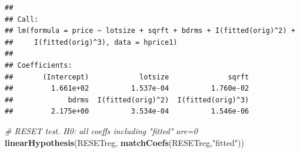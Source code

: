 \documentclass[]{book}
\newenvironment{Shaded}{\begin{snugshade}}{\end{snugshade}}
\newcommand{\CommentTok}[1]{\textcolor[rgb]{0.56,0.35,0.01}{\textit{#1}}}
\newcommand{\KeywordTok}[1]{\textcolor[rgb]{0.13,0.29,0.53}{\textbf{#1}}}
\newcommand{\NormalTok}[1]{#1}
\newcommand{\StringTok}[1]{\textcolor[rgb]{0.31,0.60,0.02}{#1}}
\begin{document}
\begin{verbatim}
## 
## Call:
## lm(formula = price ~ lotsize + sqrft + bdrms + I(fitted(orig)^2) + 
##     I(fitted(orig)^3), data = hprice1)
## 
## Coefficients:
##       (Intercept)            lotsize              sqrft  
##         1.661e+02          1.537e-04          1.760e-02  
##             bdrms  I(fitted(orig)^2)  I(fitted(orig)^3)  
##         2.175e+00          3.534e-04          1.546e-06
\end{verbatim}

\begin{Shaded}
\begin{Highlighting}[]
\CommentTok{# RESET test. H0: all coeffs including "fitted" are=0 }
\KeywordTok{linearHypothesis}\NormalTok{(RESETreg, }\KeywordTok{matchCoefs}\NormalTok{(RESETreg,}\StringTok{"fitted"}\NormalTok{))}
\end{Highlighting}
\end{Shaded}
\end{document}
